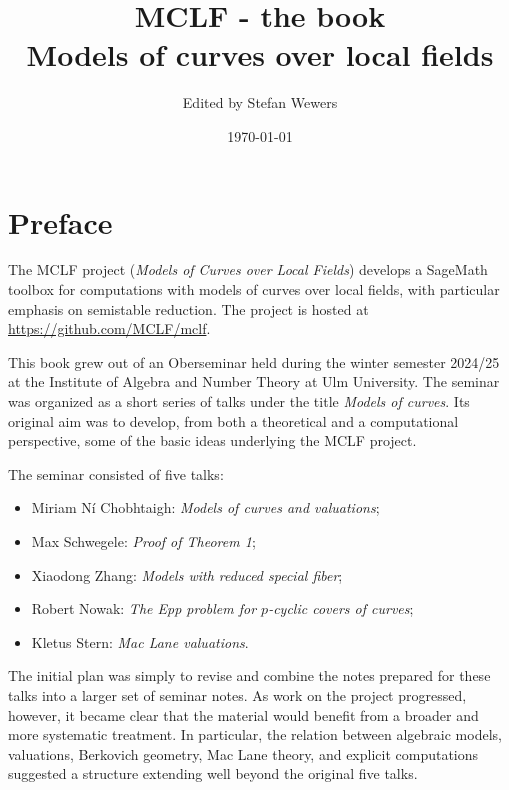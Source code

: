 \documentclass[11pt,a4paper,oneside]{book}
\title{MCLF - the book\\[0.5em]
\large Models of curves over local fields}
\author{Edited by Stefan Wewers}
\date{\today}
\begin{document}
\frontmatter

\maketitle

\tableofcontents

\chapter*{Preface}

The MCLF project (\emph{Models of Curves over Local Fields}) develops a SageMath toolbox for computations with models of curves over local fields, with particular emphasis on semistable reduction.
The project is hosted at \url{https://github.com/MCLF/mclf}.

\medskip

This book grew out of an Oberseminar held during the winter semester 2024/25 at the Institute of Algebra and Number Theory at Ulm University.
The seminar was organized as a short series of talks under the title \emph{Models of curves}.
Its original aim was to develop, from both a theoretical and a computational perspective, some of the basic ideas underlying the MCLF project.

\medskip\noindent
The seminar consisted of five talks:

\begin{itemize}
    \item Miriam Ní Chobhtaigh: \emph{Models of curves and valuations};
    \item Max Schwegele: \emph{Proof of Theorem 1};
    \item Xiaodong Zhang: \emph{Models with reduced special fiber}; %
    \item Robert Nowak: \emph{The Epp problem for \(p\)-cyclic covers of curves};
    \item Kletus Stern: \emph{Mac Lane valuations}.
\end{itemize}


The initial plan was simply to revise and combine the notes prepared for these talks into a larger set of seminar notes.
As work on the project progressed, however, it became clear that the material would benefit from a broader and more systematic treatment.
In particular, the relation between algebraic models, valuations, Berkovich geometry, Mac Lane theory, and explicit computations suggested a structure extending well beyond the original five talks.
\end{document}
